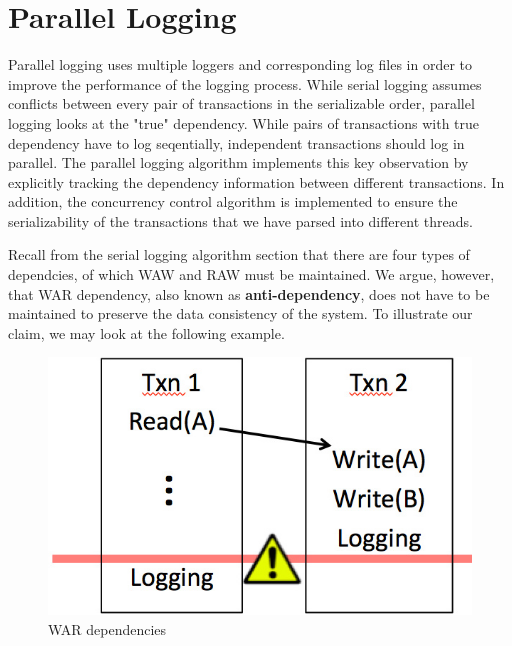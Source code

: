\section{Parallel Logging}
Parallel logging uses multiple loggers and corresponding log files in order to improve the performance of the logging process. While serial logging assumes conflicts between every pair of transactions in the serializable order, parallel logging looks at the "true" dependency. While pairs of transactions with true dependency have to log seqentially, independent transactions should log in parallel. The parallel logging algorithm implements this key observation by explicitly tracking the dependency information between different transactions. In addition, the concurrency control algorithm is implemented to ensure the serializability of the transactions that we have parsed into different threads. \par


Recall from the serial logging algorithm section that there are four types of dependcies, of which WAW and RAW must be maintained. We argue, however, that WAR dependency, also known as  \textbf{anti-dependency}, does not have to be maintained to preserve the data consistency of the system. To illustrate our claim, we may look at the following example. 

\begin{figure}
\caption{WAR dependencies}
\includegraphics[width=\textwidth]{WAR.jpg}
\end{figure}

